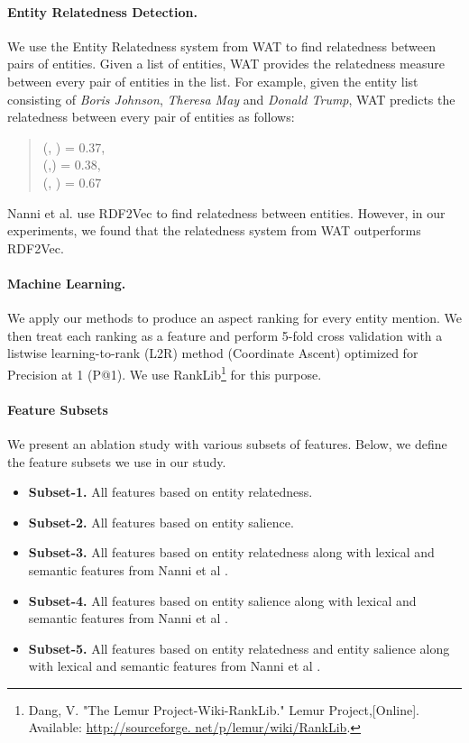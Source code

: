 \paragraph{\textbf{Entity Relatedness Detection.}}
We use the Entity Relatedness system from WAT \cite{piccinno2014wat} to find relatedness between pairs of entities. Given a list of entities, WAT provides the relatedness measure between every pair of entities in the list. For example, given the entity list consisting of \textit{Boris Johnson}, \textit{Theresa May} and \textit{Donald Trump}, WAT predicts the relatedness between every pair of entities as follows:
\begin{quote}
    (, ) = 0.37, \\
    (,)    = 0.38, \\
    (, )  = 0.67
\end{quote}
Nanni et al. \cite{nanni2018entity} use RDF2Vec \cite{ristoski2016rdf2vec} to find relatedness between entities. However, in our experiments, we found that the relatedness system from WAT outperforms RDF2Vec.

\paragraph{\textbf{Machine Learning.}}
We apply our methods to produce an aspect ranking for every entity mention. We then treat each ranking as a feature and perform 5-fold cross validation with a listwise learning-to-rank (L2R) method (Coordinate Ascent) optimized for Precision at 1 (P@1). We use RankLib\footnote{Dang, V. "The Lemur Project-Wiki-RankLib." Lemur Project,[Online]. Available: \url{http://sourceforge. net/p/lemur/wiki/RankLib}.} for this purpose. 



\paragraph{\textbf{Feature Subsets}}
We present an ablation study with various subsets of features. Below, we define the feature subsets we use in our study.

\begin{itemize}
    \item \textbf{Subset-1.} All features based on entity relatedness.
    \item \textbf{Subset-2.} All features based on entity salience.
    \item \textbf{Subset-3.} All features based on entity relatedness along with lexical and semantic features from Nanni et al \cite{nanni2018entity}.
    \item \textbf{Subset-4.} All features based on entity salience along with lexical and semantic features from Nanni et al \cite{nanni2018entity}.
    \item \textbf{Subset-5.} All features based on entity relatedness and entity salience along with lexical and semantic features from Nanni et al \cite{nanni2018entity}.
    
    
\end{itemize}

